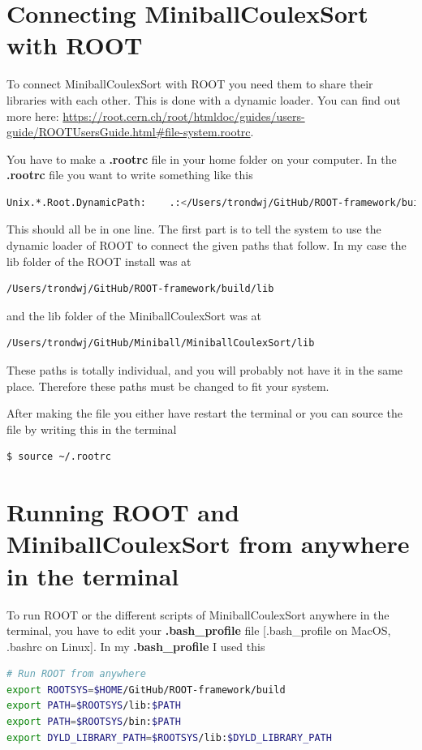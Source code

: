 \documentclass[twoside,english]{uiofysmaster/uiofysmaster}
\begin{document}
\begin{appendices}
\chapter{Connecting MiniballCoulexSort with ROOT}
To connect MiniballCoulexSort with ROOT you need them to share their libraries with each other. This is done with a dynamic loader. You can find out more here: \url{https://root.cern.ch/root/htmldoc/guides/users-guide/ROOTUsersGuide.html#file-system.rootrc}. 

You have to make a \textbf{.rootrc} file in your home folder on your computer. In the \textbf{.rootrc} file you want to write something like this 
\begin{lstlisting}[language=sh]
Unix.*.Root.DynamicPath:    .:</Users/trondwj/GitHub/ROOT-framework/build/lib>:/Users/trondwj/GitHub/Miniball/MiniballCoulexSort/lib:
\end{lstlisting}
This should all be in one line. The first part is to tell the system to use the dynamic loader of ROOT to connect the given paths that follow. In my case the lib folder of the ROOT install was at 
\begin{lstlisting}[language=sh]
/Users/trondwj/GitHub/ROOT-framework/build/lib
\end{lstlisting}
and the lib folder of the MiniballCoulexSort was at
\begin{lstlisting}[language=sh]
/Users/trondwj/GitHub/Miniball/MiniballCoulexSort/lib
\end{lstlisting}
These paths is totally individual, and you will probably not have it in the same place. Therefore these paths must be changed to fit your system. 

After making the file you either have restart the terminal or you can source the file by writing this in the terminal
\begin{lstlisting}[language=sh]
$ source ~/.rootrc
\end{lstlisting}


\chapter{Running ROOT and MiniballCoulexSort from anywhere in the terminal}
To run ROOT or the different scripts of MiniballCoulexSort anywhere in the terminal, you have to edit your \textbf{.bash\_profile} file [.bash\_profile on MacOS, .bashrc on Linux]. In my \textbf{.bash\_profile} I used this 
\begin{lstlisting}[language=sh]
# Run ROOT from anywhere
export ROOTSYS=$HOME/GitHub/ROOT-framework/build
export PATH=$ROOTSYS/lib:$PATH
export PATH=$ROOTSYS/bin:$PATH
export DYLD_LIBRARY_PATH=$ROOTSYS/lib:$DYLD_LIBRARY_PATH


\end{lstlisting}
\end{appendices}
\end{document}
